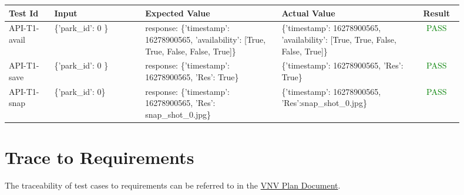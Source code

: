 \documentclass[12pt, titlepage]{article}
\begin{document}
\begin{center}
\begin{tabular}{|p{0.10\linewidth}|p{0.20\linewidth}|p{0.30\linewidth}|p{0.30\linewidth}|c|} 
\hline
\textbf{Test Id} & \textbf{Input} & \textbf{Expected Value} & \textbf{Actual
Value} & \textbf{Result} \\
\hline 
API-T1-avail &  \{'park\_id': 0 \} & response: \{'timestamp': 16278900565,
'availability': [True, True, False, False, True]\} & \{'timestamp': 16278900565,
'availability': [True, True, False, False, True]\} & \textcolor{Green}{PASS} \\
\hline 
API-T1-save & \{'park\_id': 0 \}  & response: \{'timestamp': 16278900565, 'Res':
True\} &\{'timestamp': 16278900565, 'Res': True\} & \textcolor{Green}{PASS} \\
\hline
API-T1-snap &  \{'park\_id': 0\} & response: \{'timestamp': 16278900565, 'Res':
snap\_shot\_0.jpg\} &\{'timestamp': 16278900565, 'Res':snap\_shot\_0.jpg\} &
\textcolor{Green}{PASS} \\
\hline 
\end{tabular}
\end{center}


		
\section{Trace to Requirements}
The traceability of test cases to requirements can be referred to in the
\href{https://github.com/parkd-app/park-d/blob/main/docs/VnVPlan/VnVPlan.pdf}{VNV
Plan Document}.
\end{document}

